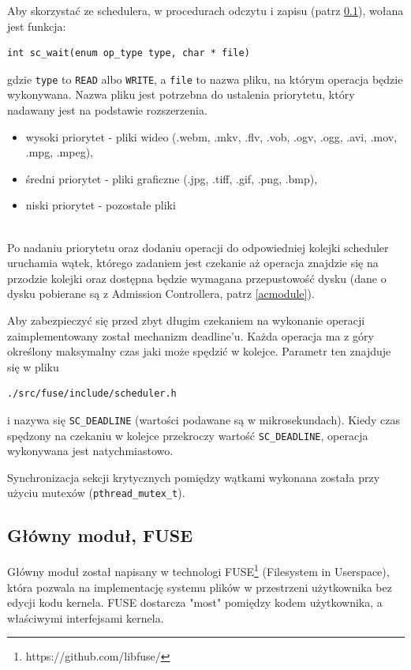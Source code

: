 Aby skorzystać ze schedulera, w procedurach odczytu i zapisu (patrz \ref{fusemodule}), wołana jest funkcja:

\begin{verbatim}
int sc_wait(enum op_type type, char * file)
\end{verbatim}

gdzie \texttt{type} to \texttt{READ} albo \texttt{WRITE}, a \texttt{file} to nazwa pliku,
na którym operacja będzie wykonywana. Nazwa pliku jest potrzebna do ustalenia priorytetu,
który nadawany jest na podstawie rozszerzenia.

\begin{itemize}
	\item wysoki priorytet - pliki wideo (.webm, .mkv, .flv, .vob, .ogv, .ogg, .avi, .mov,
    .mpg, .mpeg),
    \item średni priorytet - pliki graficzne (.jpg, .tiff, .gif, .png, .bmp),
    \item niski priorytet - pozostałe pliki
\end{itemize}
\ \\

Po nadaniu priorytetu oraz dodaniu operacji do odpowiedniej kolejki scheduler uruchamia wątek,
którego zadaniem jest czekanie aż operacja znajdzie się na przodzie kolejki oraz dostępna 
będzie wymagana przepustowość dysku (dane o dysku pobierane są z Admission Controllera, patrz \ref{acmodule}).

Aby zabezpieczyć się przed zbyt długim czekaniem na wykonanie operacji zaimplementowany został
mechanizm deadline'u. Każda operacja ma z góry określony maksymalny czas jaki może spędzić
w kolejce. Parametr ten znajduje się w pliku
\begin{verbatim}
./src/fuse/include/scheduler.h
\end{verbatim}
i nazywa się \texttt{SC\_DEADLINE} (wartości podawane są w mikrosekundach). Kiedy czas spędzony na czekaniu
w kolejce przekroczy wartość \texttt{SC\_DEADLINE}, operacja wykonywana jest natychmiastowo.

Synchronizacja sekcji krytycznych pomiędzy wątkami wykonana została przy użyciu mutexów (\texttt{pthread\_mutex\_t}).

\subsection{Główny moduł, FUSE}\label{fusemodule}
Główny moduł został napisany w technologi FUSE\footnote{https://github.com/libfuse/} (Filesystem in Userspace), która pozwala
na implementację systemu plików w przestrzeni użytkownika bez edycji kodu kernela.
FUSE dostarcza "most" pomiędzy kodem użytkownika, a właściwymi interfejsami kernela.

